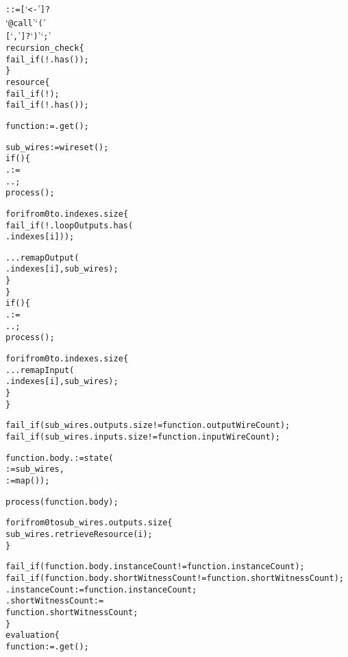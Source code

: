 \begin{alltt}\ttSyn
   ::= [  `<-' ]?
                                 `@call' `(' 
                                 [ `,'  ]? `)' `;'\ttSem
  recursion_check \{
    fail_if(!.has());
  \}
  resource \{
    fail_if(!);
    fail_if(!.has());
    
    function := .get();
    
    sub_wires := wireset();
    if() \{
      . :=
        ..;
      process();

      for i from 0 to .indexes.size \{
        fail_if(!.loopOutputs.has(
          .indexes[i]));

        ...remapOutput(
          .indexes[i], sub_wires);
      \}
    \}
    if() \{
      . :=
        ..;
      process();

      for i from 0 to .indexes.size \{
        ...remapInput(
          .indexes[i], sub_wires);
      \}
    \}
    
    fail_if(sub_wires.outputs.size != function.outputWireCount);
    fail_if(sub_wires.inputs.size != function.inputWireCount);
  
    function.body. := state(
       := sub_wires,
       := map());

    process(function.body);
  
    for i from 0 to sub_wires.outputs.size \{
      sub_wires.retrieveResource(i);
    \}

    fail_if(function.body.instanceCount != function.instanceCount);
    fail_if(function.body.shortWitnessCount != function.shortWitnessCount);
    .instanceCount := function.instanceCount;
    .shortWitnessCount :=
      function.shortWitnessCount;
  \}
  evaluation \{
    function := .get();
    

\end{alltt}
